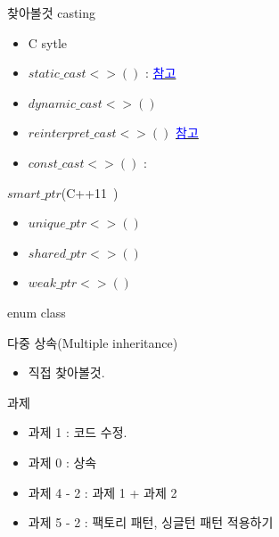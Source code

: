 \documentclass[10pt]{beamer}
\begin{document}
\begin{frame}{찾아볼것}
    casting
    \begin{itemize}
        \item C sytle 
        \item $static\_cast<>()$ : \href{https://stackoverflow.com/questions/28002/regular-cast-vs-static-cast-vs-dynamic-cast}{\textcolor{blue}{참고}}
        \item $dynamic\_cast<>()$ 
        \item $reinterpret\_cast<>()$ \href{https://stackoverflow.com/questions/573294/when-to-use-reinterpret-cast}{\textcolor{blue}{참고}}
        \item $const\_cast<>()$ : 
    \end{itemize}
    $smart\_ptr$(C++11~)
    \begin{itemize}
        \item $unique\_ptr<>()$
        \item $shared\_ptr<>()$
        \item $weak\_ptr<>()$
    \end{itemize}
    enum class
\end{frame}




\begin{frame}{다중 상속(Multiple inheritance)}
    \begin{itemize}
        \item 직접 찾아볼것.
    \end{itemize}    
\end{frame}    



\begin{frame}{과제}
    \begin{itemize}
        \item 과제 1 : 코드 수정.
        \item 과제 0 : 상속 
        \item 과제 4 - 2 : 과제 1 + 과제 2
        \item 과제 5 - 2 : 팩토리 패턴, 싱글턴 패턴 적용하기 
    \end{itemize}
\end{frame}    
\end{document}
